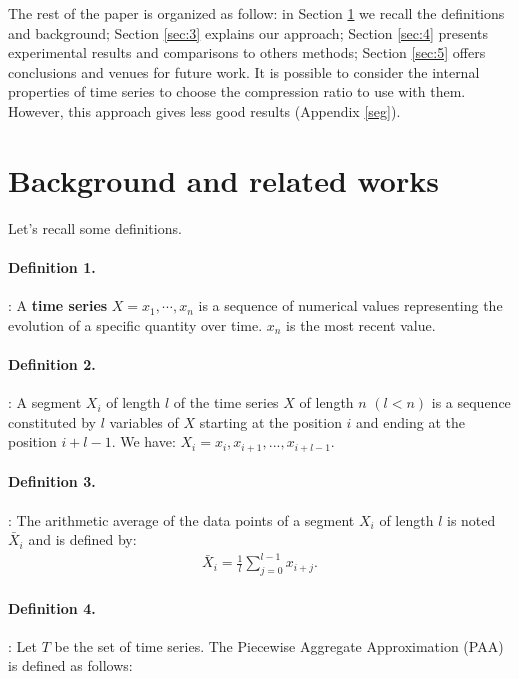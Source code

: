 The rest of the paper is organized as follow: in Section
\ref{sec:1} we recall the definitions and background; Section \ref{sec:3} explains our approach;
Section \ref{sec:4} presents experimental results and comparisons to others methods; Section
\ref{sec:5} offers conclusions and venues for future work.   It is possible to consider the internal properties of time series to choose the compression ratio to use with them. However, this approach gives less good results (Appendix \ref{seg}).




\section{Background and related works}
\label{sec:1}
Let's recall some definitions.


\paragraph{Definition 1.}:  A \textbf{time series}
$X=x_{1},\cdots,x_{n}$ is a sequence of numerical values representing the evolution of a specific quantity over time. $x_{n}$ is the most recent value.


\paragraph{Definition 2.}:
A segment  $X_{i}$ of length  $l$ of the time series $X$ of length $n$
$(l<n)$ is a sequence constituted by $l$  variables of $X$ starting at the position $i$ and ending at the position $i+l-1$.
We have: $X_{i}=x_{i},x_{i+1},...,x_{i+l-1}$.


\paragraph{Definition 3.}:
The arithmetic average of the data points of a segment  $X_{i}$ of length
$l$ is noted $\bar{X}_{i}$ and is defined by:
\begin{eqnarray}
\bar{X}_{i}=\frac{1}{l}\sum_{j=0}^{l-1}x_{i+j}.
\end{eqnarray}



\paragraph{Definition 4.}:
Let $T$ be the set of time series. The Piecewise Aggregate Approximation (PAA) is defined as follows:


